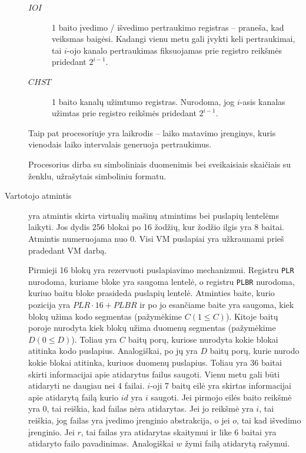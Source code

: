 \begin{description}
\begin{description}
      \item[$IOI$] 1 baito įvedimo / išvedimo pertraukimo registras – 
        praneša, kad veiksmas baigėsi. Kadangi vienu 
        metu gali įvykti keli pertraukimai, tai $i$-ojo kanalo pertraukimas
        fiksuojamas prie registro reikšmės pridedant $2^{i-1}$.
      \item[$CHST$] 1 baito kanalų užimtumo registras. Nurodoma, jog
        $i$-asis kanalas užimtas prie registro reikšmės pridedant 
        $2^{i-1}$.
    \end{description}

    Taip pat procesoriuje yra laikrodis – laiko matavimo įrenginys, kuris
    vienodais laiko intervalais generuoja pertraukimus. 

    Procesorius dirba su simboliniais duomenimis bei sveikaisiais 
    skaičiais su ženklu, užrašytais simboliniu formatu.
  \item[Vartotojo atmintis] yra atmintis skirta virtualių mašinų atmintims 
    bei puslapių lentelėms laikyti. Jos dydis 256 blokai po 16 žodžių, kur
    žodžio ilgis yra 8 baitai. Atmintis numeruojama nuo 0. Visi VM 
    puslapiai yra užkraunami prieš pradedant VM darbą.

    Pirmieji 16 blokų yra rezervuoti puslapiavimo mechanizmui. Registru
    \verb|PLR| nurodoma, kuriame bloke yra saugoma lentelė, o registru
    \verb|PLBR| nurodoma, kuriuo baitu bloke prasideda puslapių lentelė.
    Atminties baite, kurio pozicija yra $PLR \cdot 16 + PLBR$ ir po jo 
    esančiame baite yra saugoma, kiek blokų užima kodo segmentas 
    (pažymėkime $C (1 \leq C)$). Kitoje baitų poroje nurodyta kiek blokų 
    užima duomenų segmentas (pažymėkime $D (0 \leq D)$). Toliau yra 
    $C$ baitų porų, kuriose nurodyta kokie blokai atitinka kodo puslapius.
    Analogiškai, po jų yra $D$ baitų porų, kurie nurodo kokie blokai 
    atitinka, kuriuos duomenų puslapius. Toliau yra 36 baitai skirti
    informacijai apie atidarytus failus saugoti. Vienu metu gali
    būti atidaryti ne daugiau nei 4 failai. $i$-oji 7 baitų eilė yra skirtas
    informacijai apie atidarytą failą kurio $id$ yra $i$ saugoti. Jei
    pirmojo eilės baito reikšmė yra $0$, tai reiškia, kad failas nėra
    atidarytas. Jei jo reikšmė yra $i$, tai reiškia, jog failas yra
    įvedimo įrenginio abstrakcija, o jei $o$, tai kad išvedimo įrenginio.
    Jei $r$, tai failas yra atidarytas skaitymui ir like 6 baitai yra
    atidaryto failo pavadinimas. Analogiškai $w$ žymi failą atidarytą
    rašymui.


\end{description}
